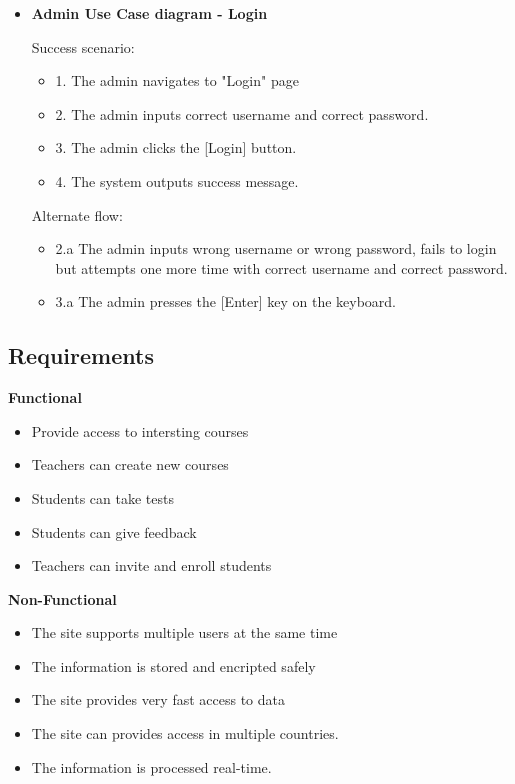 \documentclass[12pt,a4paper,titlepage]{article}
\begin{document}
\begin{itemize}
\item
\noindent\textbf{Admin Use Case diagram - Login}
\begin{description}
    \item[Success scenario:]
\end{description}
\renewcommand{\labelenumii}{\arabic{enumii}}
\begin{itemize}
  \item 1. The admin navigates to "Login" page
  \item 2. The admin inputs correct username and correct password.
  \item 3. The admin clicks the [Login] button.
  \item 4. The system outputs success message.
\end{itemize}
\begin{description}
    \item[Alternate flow:]
\end{description}
\begin{itemize}
  \item 2.a The admin inputs wrong username or wrong password, fails to login but attempts one more time with correct username and correct password.
  \item 3.a The admin presses the [Enter] key on the keyboard.
\end{itemize}
\end{itemize}

\subsection{Requirements}
\noindent\textbf{Functional}
\begin{itemize}
	\item Provide access to intersting courses
	\item Teachers can create new courses
	\item Students can take tests
	\item Students can give feedback
	\item Teachers can invite and enroll students
\end{itemize}
\textbf{Non-Functional}
\begin{itemize}
	\item The site supports multiple users at the same time
	\item The information is stored and encripted safely
	\item The site provides very fast access to data
	\item The site can provides access in multiple countries.
	\item The information is processed real-time.
\end{itemize}
\end{document}
